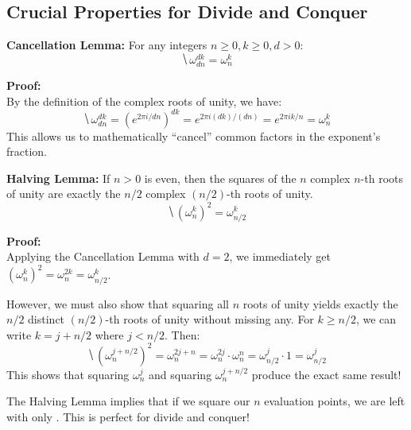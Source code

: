 \documentclass[11  pt]{article}
\begin{document}
\vs{1cm}

\subsection{Crucial Properties for Divide and Conquer}

\begin{lemma}\textbf{Cancellation Lemma:} For any integers $n \geq 0, k \geq 0, d > 0$:
    \begin{equation*}
        \hide{\omega_{dn}^{dk} = \omega_n^k}
    \end{equation*}
\end{lemma}

\vs{0.25cm}
\textbf{Proof:} \\
By the definition of the complex roots of unity, we have:
\begin{equation*}
    \hide{\omega_{dn}^{dk} = \left(e^{2\pi i / dn}\right)^{dk} = e^{2\pi i (dk) / (dn)} = e^{2\pi i k / n} = \omega_n^k}
\end{equation*}
This allows us to mathematically ``cancel'' common factors in the exponent's fraction.

\vs{1cm}

\begin{lemma}\textbf{Halving Lemma:} If $n > 0$ is even, then the squares of the $n$ complex $n$-th roots of unity are exactly the $n/2$ complex $(n/2)$-th roots of unity.
    \begin{equation*}
        \hide{(\omega_n^k)^2 = \omega_{n/2}^k}
    \end{equation*}
\end{lemma}

\vs{0.25cm}
\textbf{Proof:} \\
Applying the Cancellation Lemma with $d=2$, we immediately get $(\omega_n^k)^2 = \omega_n^{2k} = \omega_{n/2}^k$.

However, we must also show that squaring all $n$ roots of unity yields exactly the $n/2$ distinct $(n/2)$-th roots of unity without missing any. For $k \geq n/2$, we can write $k = j + n/2$ where $j < n/2$. Then:
\begin{equation*}
    \hide{(\omega_n^{j + n/2})^2 = \omega_n^{2j + n} = \omega_n^{2j} \cdot \omega_n^n = \omega_{n/2}^j \cdot 1 = \omega_{n/2}^j}
\end{equation*}
This shows that squaring $\omega_n^j$ and squaring $\omega_n^{j + n/2}$ produce the exact same result!

\vs{1cm}
The Halving Lemma implies that if we square our $n$ evaluation points, we are left with only . This is perfect for divide and conquer!
\end{document}
